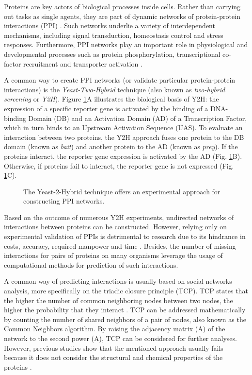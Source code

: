 Proteins are key actors of biological processes inside cells. Rather
than carrying out tasks as single agents, they are part of dynamic
networks of protein-protein interactions (PPI) \cite{Lin2017}. Such
networks underlie a variety of interdependent mechanisms, including
signal transduction, homeostasis control and stress responses. Furthermore,
PPI networks play an important role in physiological and developmental
processes such as protein phosphorylation, transcriptional co-factor
recruitment and transporter activation \cite{Zhang2010PPI}.

A common way to create PPI networks (or validate particular protein-protein
interactions) is the \emph{Yeast-Two-Hybrid} technique (also known
as \emph{two-hybrid screening} or \emph{Y2H}). Figure \ref{Y2H}A
illustrates the biological basis of Y2H: the expression of a specific
reporter gene is activated by the binding of a DNA-binding Domain
(DB) and an Activation Domain (AD) of a Transcription Factor, which
in turn binds to an Upstream Activation Sequence (UAS). To evaluate
an interaction between two proteins, the Y2H approach fuses one protein
to the DB domain (known as \emph{bait}) and another protein to the
AD (known as \emph{prey}). If the proteins interact, the reporter
gene expression is activated by the AD (Fig. \ref{Y2H}B). Otherwise,
if proteins fail to interact, the reporter gene is not expressed (Fig.
\ref{Y2H}C).

\begin{figure}[h]
\caption{\label{Y2H}The Yeast-2-Hybrid technique offers an experimental approach
for constructing PPI networks.}

\end{figure}

Based on the outcome of numerous Y2H experiments, undirected networks
of interactions between proteins can be constructed. However, relying
only on experimental validation of PPIs is detrimental to research
due to its hindrance in costs, accuracy, required manpower and time
\cite{Laraia2015PPI,Macalino2018PPI}. Besides, the number of missing
interactions for pairs of proteins on many organisms leverage the
usage of computational methods for prediction of such interactions.

A common way of predicting interactions is usually based on social
networks analysis, more specifically on the triadic closure principle
(TCP). TCP states that the higher the number of common neighboring
nodes between two nodes, the higher the probability that they interact
\cite{Goldberg2003SmallWorld}. TCP can be addressed mathematically
by counting the number of shared neighbors of a pair of nodes, also
known as the Common Neighbors algorithm. By raising the adjacency
matrix (A) of the network to the second power (A\texttwosuperior ),
TCP can be considered for further analyses. However, previous studies
show that the mentioned approach usually fails because it does not
consider the structural and chemical properties of the proteins \cite{Cannistraci2013Networks,Kovacs2019}.

